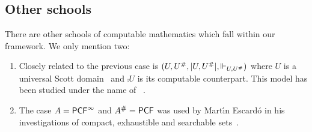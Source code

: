 \subsection{Other schools}
\label{sec:other-schools}

There are other schools of computable mathematics which fall within
our framework. We only mention two:
%
\begin{enumerate}
\item
  Closely related to the previous case is $(U, U^{\#}, |U, U^{\#}|, {\Vdash_{U, U^{\#}}})$ where
  $U$ is a universal Scott domain~ and $\comp{U}$ is
  its computable counterpart. This model has been studied under the
  name of ~.
\item
  The case $A = \mathsf{PCF}^\infty$ and $A^{\#} = \mathsf{PCF}$ was used by
  Mart{\'\i}n Escard\'o in his investigations of compact, exhaustible
  and searchable sets~.
\end{enumerate}



